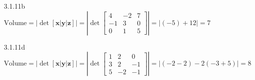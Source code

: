 \documentclass{article}
\theoremstyle{definition}
\begin{document}
	\begin{prob}{3.1.11b} $  $ \vspace{1mm} \\
		$ \text{Volume} = | \det[\mathbf{x} | \mathbf{y} | \mathbf{z}] | = \left| \det \begin{bmatrix} 4 & -2 & 7 \\ -1 & 3 & 0 \\ 0 & 1 & 5 \end{bmatrix} \right| = | (-5) + 12 | = \boxed{7} $ 
	\end{prob}

	\begin{prob}{3.1.11d} $  $ \vspace{1mm} \\
		$ \text{Volume} = | \det[\mathbf{x} | \mathbf{y} | \mathbf{z}] | = \left| \det \begin{bmatrix} 1 & 2 & 0 \\ 3 & 2 & -1 \\ 5 & -2 & -1 \end{bmatrix} \right| = | (-2-2) - 2(-3+5) | = \boxed{8} $ 
	\end{prob}
\end{document}
